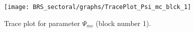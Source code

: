\begin{figure}[H]
\centering
  \texttt{[image: BRS\_sectoral/graphs/TracePlot\_Psi\_mc\_blck\_1]}\\
    \caption{Trace plot for parameter ${\Psi_{mc}}$ (block number 1).}
\end{figure}
